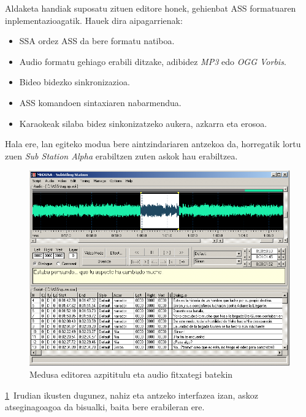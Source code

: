 Aldaketa handiak suposatu zituen editore honek, gehienbat ASS formatuaren inplementazioagatik. Hauek dira aipagarrienak:
\begin{itemize}
\item SSA ordez ASS da bere formatu natiboa.
\item Audio formatu gehiago erabili ditzake, adibidez \textit{MP3} edo \textit{OGG Vorbis}.
\item Bideo bidezko sinkronizazioa.
\item ASS komandoen sintaxiaren nabarmendua.
\item Karaokeak silaba bidez sinkonizatzeko aukera, azkarra eta erosoa.
\end{itemize}

Hala ere, lan egiteko modua bere aintzindariaren antzekoa da, horregatik lortu zuen \textit{Sub Station Alpha} erabiltzen zuten askok hau erabiltzea.
\begin{figure}[htb]
\begin{center}
\includegraphics[width=\columnwidth, natwidth=800pt, natheight=600pt]{Pictures/Chapter2/medusa-audio.png}
\caption{Medusa editorea azpititulu eta audio fitxategi batekin}
\label{medusa-audio}
\end{center}
\end{figure}

\ref{medusa-audio}~Irudian ikusten dugunez, nahiz eta antzeko interfazea izan, askoz atseginagoagoa da bisualki, baita bere erabileran ere.

